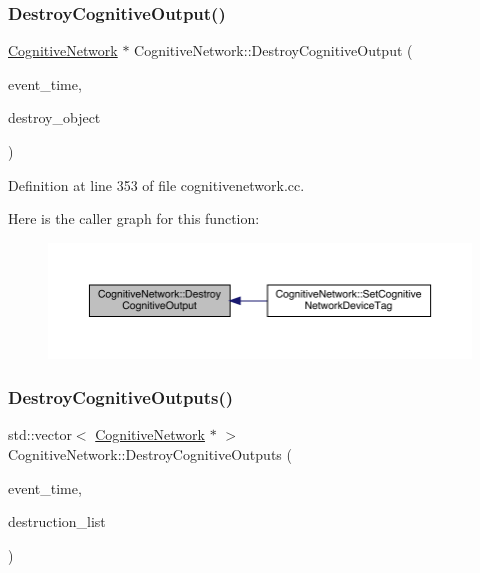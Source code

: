 \subsubsection{\texorpdfstring{Destroy\+Cognitive\+Output()}{DestroyCognitiveOutput()}}
{\footnotesize\ttfamily \hyperlink{class_cognitive_network}{Cognitive\+Network} $\ast$ Cognitive\+Network\+::\+Destroy\+Cognitive\+Output (\begin{DoxyParamCaption}\item[{std\+::chrono\+::time\+\_\+point$<$ \hyperlink{universe_8h_a0ef8d951d1ca5ab3cfaf7ab4c7a6fd80}{Clock} $>$}]{event\+\_\+time,  }\item[{\hyperlink{class_cognitive_network}{Cognitive\+Network} $\ast$}]{destroy\+\_\+object }\end{DoxyParamCaption})}



Definition at line 353 of file cognitivenetwork.\+cc.

Here is the caller graph for this function\+:
\nopagebreak
\begin{figure}[H]
\begin{center}
\leavevmode
\includegraphics[width=350pt]{class_cognitive_network_a8475cf7277d25532bb31926e768600e8_icgraph}
\end{center}
\end{figure}
\mbox{\label{class_cognitive_network_ad08191cbab02f26f69d25bc7e6b5c1ee}} 
\subsubsection{\texorpdfstring{Destroy\+Cognitive\+Outputs()}{DestroyCognitiveOutputs()}}
{\footnotesize\ttfamily std\+::vector$<$ \hyperlink{class_cognitive_network}{Cognitive\+Network} $\ast$ $>$ Cognitive\+Network\+::\+Destroy\+Cognitive\+Outputs (\begin{DoxyParamCaption}\item[{std\+::chrono\+::time\+\_\+point$<$ \hyperlink{universe_8h_a0ef8d951d1ca5ab3cfaf7ab4c7a6fd80}{Clock} $>$}]{event\+\_\+time,  }\item[{std\+::vector$<$ \hyperlink{class_cognitive_network}{Cognitive\+Network} $\ast$$>$}]{destruction\+\_\+list }\end{DoxyParamCaption})}



